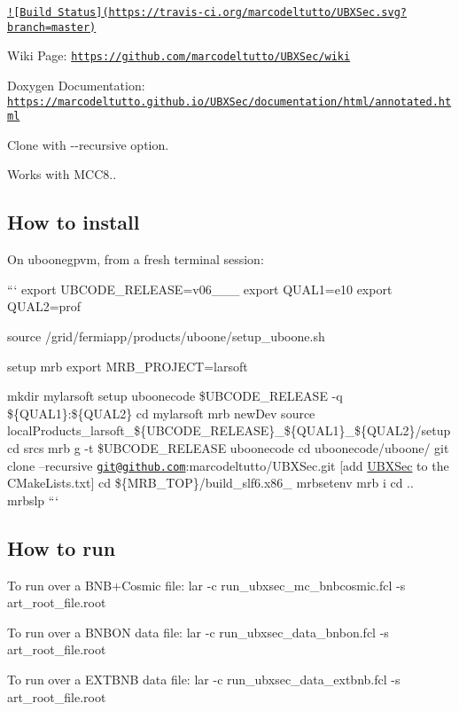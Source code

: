 \href{https://travis-ci.org/marcodeltutto/UBXSec}{\tt !\mbox{[}Build Status\mbox{]}(https\-://travis-\/ci.\-org/marcodeltutto/\-U\-B\-X\-Sec.\-svg?branch=master)}

Wiki Page\-: \href{https://github.com/marcodeltutto/UBXSec/wiki}{\tt https\-://github.\-com/marcodeltutto/\-U\-B\-X\-Sec/wiki}

Doxygen Documentation\-: \href{https://marcodeltutto.github.io/UBXSec/documentation/html/annotated.html}{\tt https\-://marcodeltutto.\-github.\-io/\-U\-B\-X\-Sec/documentation/html/annotated.\-html}

Clone with {\ttfamily -\/-\/recursive} option.

Works with M\-C\-C8..

\subsection*{How to install}

On uboonegpvm, from a fresh terminal session\-:

``` export U\-B\-C\-O\-D\-E\-\_\-\-R\-E\-L\-E\-A\-S\-E=v06\-\_\-\_\-\_ export Q\-U\-A\-L1=e10 export Q\-U\-A\-L2=prof

source /grid/fermiapp/products/uboone/setup\-\_\-uboone.sh

setup mrb export M\-R\-B\-\_\-\-P\-R\-O\-J\-E\-C\-T=larsoft

mkdir mylarsoft setup uboonecode \$\-U\-B\-C\-O\-D\-E\-\_\-\-R\-E\-L\-E\-A\-S\-E -\/q \$\{Q\-U\-A\-L1\}\-:\$\{Q\-U\-A\-L2\} cd mylarsoft mrb new\-Dev source local\-Products\-\_\-larsoft\-\_\-\$\{U\-B\-C\-O\-D\-E\-\_\-\-R\-E\-L\-E\-A\-S\-E\}\-\_\-\$\{Q\-U\-A\-L1\}\-\_\-\$\{Q\-U\-A\-L2\}/setup cd srcs mrb g -\/t \$\-U\-B\-C\-O\-D\-E\-\_\-\-R\-E\-L\-E\-A\-S\-E uboonecode cd uboonecode/uboone/ git clone --recursive \href{mailto:git@github.com}{\tt git@github.\-com}\-:marcodeltutto/\-U\-B\-X\-Sec.\-git \mbox{[}add \hyperlink{classUBXSec}{U\-B\-X\-Sec} to the C\-Make\-Lists.\-txt\mbox{]} cd \$\{M\-R\-B\-\_\-\-T\-O\-P\}/build\-\_\-slf6.x86\-\_ mrbsetenv mrb i cd .. mrbslp ```

\subsection*{How to run}

To run over a B\-N\-B+\-Cosmic file\-: {\ttfamily lar -\/c run\-\_\-ubxsec\-\_\-mc\-\_\-bnbcosmic.\-fcl -\/s art\-\_\-root\-\_\-file.\-root}

To run over a B\-N\-B\-O\-N data file\-: {\ttfamily lar -\/c run\-\_\-ubxsec\-\_\-data\-\_\-bnbon.\-fcl -\/s art\-\_\-root\-\_\-file.\-root}

To run over a E\-X\-T\-B\-N\-B data file\-: {\ttfamily lar -\/c run\-\_\-ubxsec\-\_\-data\-\_\-extbnb.\-fcl -\/s art\-\_\-root\-\_\-file.\-root} 